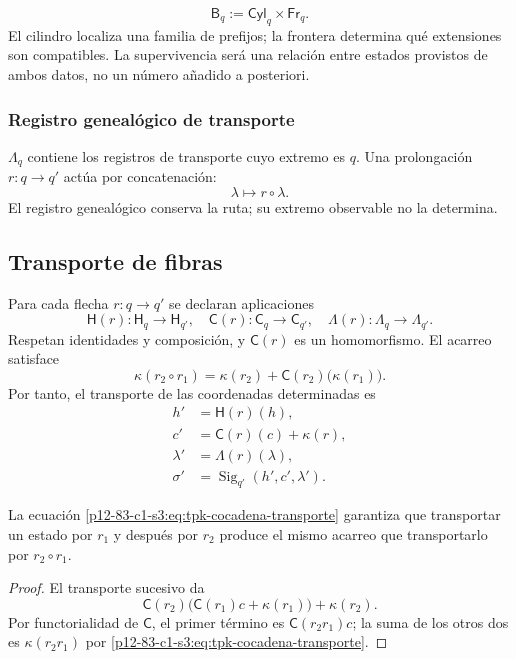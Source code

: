 {\[
 \mathsf B_q:=\mathsf{Cyl}_q\times\mathsf{Fr}_q.
\]
El cilindro localiza una familia de prefijos; la frontera determina qué
extensiones son compatibles. La supervivencia será una relación entre
estados provistos de ambos datos, no un número añadido a posteriori.

\subsubsection{Registro genealógico de transporte}

\(\Lambda_q\) contiene los registros de transporte cuyo extremo es
\(q\). Una prolongación \(r:q\to q'\) actúa por concatenación:
\[
 \lambda\longmapsto r\circ\lambda.
\]
El registro genealógico conserva la ruta; su extremo observable no la determina.

\subsection{Transporte de fibras}

Para cada flecha \(r:q\to q'\) se declaran aplicaciones
\[
 \mathsf H(r):\mathsf H_q\to\mathsf H_{q'},
 \quad
 \mathsf C(r):\mathsf C_q\to\mathsf C_{q'},
 \quad
 \Lambda(r):\Lambda_q\to\Lambda_{q'}.
\]
Respetan identidades y composición, y \(\mathsf C(r)\) es un homomorfismo.
El acarreo satisface
\begin{equation}
 \kappa(r_2\circ r_1)
 =\kappa(r_2)+\mathsf C(r_2)\bigl(\kappa(r_1)\bigr).
\label{p12-83-c1-s3:eq:tpk-cocadena-transporte}
\end{equation}
Por tanto, el transporte de las coordenadas determinadas es
\begin{align*}
 h'&=\mathsf H(r)(h),\\
 c'&=\mathsf C(r)(c)+\kappa(r),\\
 \lambda'&=\Lambda(r)(\lambda),\\
 \sigma'&=\operatorname{Sig}_{q'}(h',c',\lambda').
\end{align*}

\begin{lemma}
\label{p12-83-c1-s3:lem:tpk-asociatividad-acarreo}
La ecuación \cref{p12-83-c1-s3:eq:tpk-cocadena-transporte} garantiza que transportar un
estado por \(r_1\) y después por \(r_2\) produce el mismo acarreo que
transportarlo por \(r_2\circ r_1\).
\end{lemma}

\begin{proof}
El transporte sucesivo da
\[
 \mathsf C(r_2)\bigl(\mathsf C(r_1)c+\kappa(r_1)\bigr)+\kappa(r_2).
\]
Por functorialidad de \(\mathsf C\), el primer término es
\(\mathsf C(r_2r_1)c\); la suma de los otros dos es
\(\kappa(r_2r_1)\) por \cref{p12-83-c1-s3:eq:tpk-cocadena-transporte}.
\end{proof}

}
